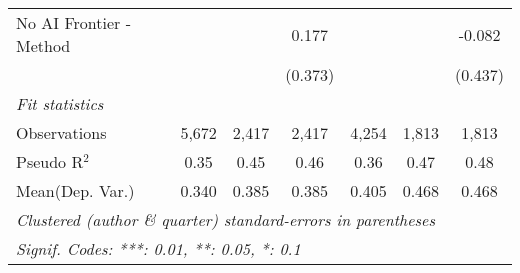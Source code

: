 \begin{tabular}{lcccccc}
   No AI Frontier - Method &               &         & 0.177         &               &               & -0.082\\   
                           &               &         & (0.373)       &               &               & (0.437)\\   
   \midrule
   \emph{Fit statistics}\\
   Observations            & 5,672         & 2,417   & 2,417         & 4,254         & 1,813         & 1,813\\  
   Pseudo R$^2$            & 0.35          & 0.45    & 0.46          & 0.36          & 0.47          & 0.48\\  
Mean(Dep. Var.) & 0.340 & 0.385 & 0.385 & 0.405 & 0.468 & 0.468 \\
   \midrule \midrule
   \multicolumn{7}{l}{\emph{Clustered (author \& quarter) standard-errors in parentheses}}\\
   \multicolumn{7}{l}{\emph{Signif. Codes: ***: 0.01, **: 0.05, *: 0.1}}\\
\end{tabular}
\par\endgroup
